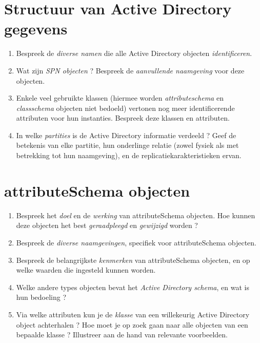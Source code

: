 \documentclass{report}
\begin{document}
	\section{Structuur van Active Directory gegevens}
	\begin{enumerate}
		\item Bespreek de \textit{diverse namen} die alle Active Directory objecten \textit{identificeren}. 
		
		\item Wat zijn \textit{SPN objecten} ? Bespreek de \textit{aanvullende naamgeving} voor deze objecten. 
		
		\item Enkele veel gebruikte klassen (hiermee worden \textit{attributeschema} en \textit{classschema} objecten niet bedoeld) vertonen nog meer identificerende attributen voor hun instanties. Bespreek deze klassen en attributen.
		
		\item In welke \textit{partities} is de Active Directory informatie verdeeld ? Geef de betekenis van elke partitie, hun onderlinge relatie (zowel fysiek als met betrekking tot hun naamgeving), en de replicatiekarakteristieken ervan. 
	\end{enumerate}

	\section{attributeSchema objecten }
	\begin{enumerate}
		\item Bespreek het \textit{doel} en de \textit{werking} van attributeSchema objecten. Hoe kunnen deze objecten het best \textit{geraadpleegd} en \textit{gewijzigd} worden ?
		
		\item Bespreek de \textit{diverse naamgevingen}, specifiek voor attributeSchema objecten.
		
		\item Bespreek de belangrijkste \textit{kenmerken} van attributeSchema objecten, en op welke waarden die ingesteld kunnen worden.
		
		\item Welke andere types objecten bevat het \textit{Active Directory schema}, en wat is hun bedoeling ? 
		
		\item Via welke attributen kun je de \textit{klasse} van een willekeurig Active Directory object achterhalen ? Hoe moet je op zoek gaan naar alle objecten van een bepaalde klasse ? Illustreer aan de hand van relevante voorbeelden. 
	\end{enumerate}
\end{document}
